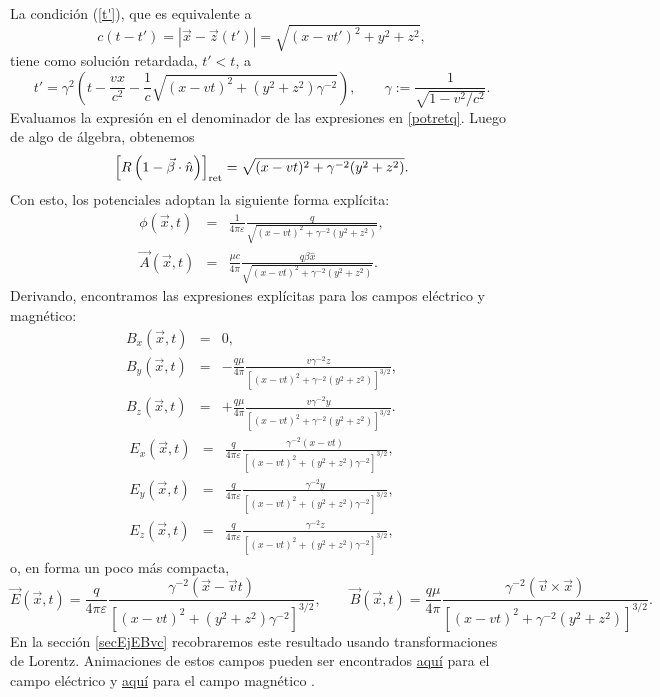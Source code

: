 La condición (\ref{t'}), que es equivalente a
\begin{equation}
c(t-t')=\left|\vec{x}-\vec{z}(t')\right|=\sqrt{(x-vt')^2+y^2+z^2},
\end{equation}
tiene como solución retardada, $t'<t$, a
\begin{equation}
t'=\gamma^2\left( t-\frac{vx}{c^2}-\frac{1}{c}\sqrt{(x-vt)^2+
(y^2+z^2)\gamma^{-2}}\right) , \qquad \gamma:=\frac{1}{\sqrt{1-v^2/c^2}}.
\end{equation}
Evaluamos la expresión en el denominador de las expresiones en \eqref{potretq}. Luego de algo de álgebra, obtenemos
\begin{equation}
\left[ R\left(1-\vec{\beta}\cdot\hat{n}\right)\right]_{\rm ret}=\sqrt{(x-vt)^2+  \gamma^{-2}(y^2+z^2)}.
\end{equation}
Con esto, los potenciales adoptan la siguiente forma explícita:
\begin{eqnarray}
\phi(\vec{x},t)&=&\frac{1}{4\pi\varepsilon}\frac{q}{\sqrt{(x-vt)^2+ \gamma^{-2}(y^2+z^2)}} ,\\
\vec{A}(\vec{x},t)&=&\frac{\mu c}{4\pi} \frac{q\beta\hat{x}}{\sqrt{(x-vt)^2+
\gamma^{-2}(y^2+z^2)}}.
\end{eqnarray}
Derivando, encontramos las expresiones explícitas para los campos eléctrico y magnético:
\begin{eqnarray}
B_x(\vec{x},t)&=&0, \\
B_y(\vec{x},t)&=&-\frac{q\mu}{4\pi}\frac{v\gamma^{-2}z}{\left[ (x-vt)^2+
\gamma^{-2}(y^2+z^2)\right]^{3/2}}, \\
B_z(\vec{x},t)&=&+\frac{q\mu}{4\pi}\frac{v\gamma^{-2}y}{\left[(x-vt)^2+
\gamma^{-2}(y^2+z^2)\right]^{3/2}}.
\end{eqnarray}
\begin{eqnarray}
E_x(\vec{x},t)&=&\frac{q}{4\pi\varepsilon}\frac{\gamma^{-2}\left( x-vt\right) }{\left[ (x-vt)^2+
(y^2+z^2)\gamma^{-2}\right] ^{3/2}}, \\
E_y(\vec{x},t)&=&\frac{q}{4\pi\varepsilon}\frac{\gamma^{-2}y}{\left[ (x-vt)^2+
(y^2+z^2)\gamma^{-2}\right] ^{3/2}},\\
E_z(\vec{x},t)&=&\frac{q}{4\pi\varepsilon}\frac{\gamma^{-2}z }{\left[ (x-vt)^2+
(y^2+z^2)\gamma^{-2}\right]
^{3/2}},
\end{eqnarray}
o, en forma un poco más compacta,
\begin{equation}\label{EBqvconst}
\vec{E}(\vec{x},t)=\frac{q}{4\pi\varepsilon}\frac{\gamma^{-2}\left(\vec{x}-\vec{v}t\right)}{\left[(x-vt)^2+ (y^2+z^2)\gamma^{-2}\right] ^{3/2}},  \qquad
\vec{B}(\vec{x},t)=\frac{q\mu}{4\pi}\frac{\gamma^{-2}(\vec{v}\times\vec{x})}{\left[(x-vt)^2+\gamma^{-2}(y^2+z^2)\right]^{3/2}}.
\end{equation}
En la sección \ref{secEjEBvc} recobraremos este resultado usando transformaciones de Lorentz. Animaciones de estos campos pueden ser encontrados \href{http://web.mit.edu/viz/EM/visualizations/electrostatics/ElectricFieldConfigurations/MovingChargePosElec/movingChargePosElec.htm}{aquí} para el campo eléctrico y \href{http://web.mit.edu/viz/EM/visualizations/magnetostatics/MagneticFieldConfigurations/MovingChargePosMag/MovingChargePosMag.htm}{aquí} para el campo magnético \cite{MIT}.


